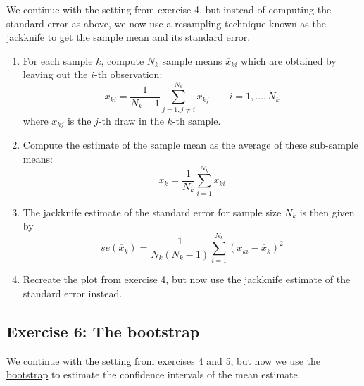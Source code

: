 \documentclass[10pt]{scrartcl}
\providecommand{\tightlist}{%
      \setlength{\itemsep}{0pt}\setlength{\parskip}{0pt}}
\begin{document}
We continue with the setting from exercise 4, but instead of computing
the standard error as above, we now use a resampling technique known as
the \href{https://en.wikipedia.org/wiki/Jackknife_resampling}{jackknife}
to get the sample mean and its standard error.

\begin{enumerate}
\def\labelenumi{\arabic{enumi}.}
\tightlist
\item
  For each sample \(k\), compute \(N_k\) sample means
  \(\overline{x}_{ki}\) which are obtained by leaving out the \(i\)-th
  observation: \[
  \overline{x}_{ki} = \frac{1}{N_k-1}\sum_{j = 1, j \neq i}^{N_k} x_{kj} 
      \qquad i = 1,\dots,N_k
  \] where \(x_{kj}\) is the \(j\)-th draw in the \(k\)-th sample.
\item
  Compute the estimate of the sample mean as the average of these
  sub-sample means: \[
  \overline{x}_k = \frac{1}{N_k}\sum_{i=1}^{N_k} \overline{x}_{ki}
  \]
\item
  The jackknife estimate of the standard error for sample size \(N_k\)
  is then given by \[
  se(\overline{x}_k) = \frac{1}{N_k(N_k-1)} \sum_{i=1}^{N_k}(x_{ki}-\overline{x}_k)^2
  \]
\item
  Recreate the plot from exercise 4, but now use the jackknife estimate
  of the standard error instead.
\end{enumerate}

    \hypertarget{exercise-6-the-bootstrap}{%
\subsection{Exercise 6: The bootstrap}\label{exercise-6-the-bootstrap}}

We continue with the setting from exercises 4 and 5, but now we use the
\href{https://en.wikipedia.org/wiki/Bootstrapping_(statistics)\#Case_resampling}{bootstrap}
to estimate the confidence intervals of the mean estimate.
\end{document}
